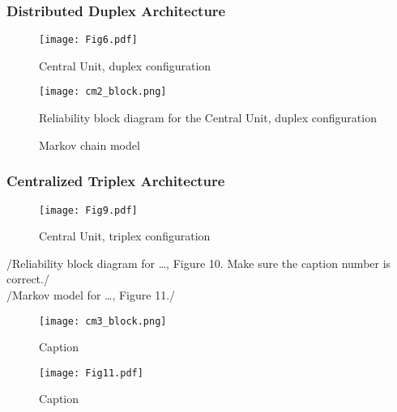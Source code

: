 \subsubsection{Distributed Duplex Architecture}
\begin{figure}[H]
  \centering
  \texttt{[image: Fig6.pdf]}
  \caption{Central Unit, duplex configuration }
  \label{fig6}
\end{figure}
\begin{figure}[H]
  \centering
  \texttt{[image: cm2\_block.png]}
  \caption{Reliability block diagram for the Central Unit, duplex configuration}
  \label{fig7}
\end{figure}
\begin{figure}[h!]
\begin{center}
\caption{Markov chain model}
\end{center}
\end{figure}
\subsubsection{Centralized Triplex Architecture}

\begin{figure}[H]
  \centering
  \texttt{[image: Fig9.pdf]}
  \caption{Central Unit, triplex configuration }
  \label{fig9}
\end{figure}
/{Reliability block diagram for …, Figure 10.  Make sure the caption number is correct.}/
\\/{Markov model for …, Figure 11.}/

\begin{figure}[H]
  \centering
  \texttt{[image: cm3\_block.png]}
  \caption{Caption }
  \label{fig10}
\end{figure}
\begin{figure}[H]
  \centering
  \texttt{[image: Fig11.pdf]}
  \caption{Caption}
  \label{fig11}
\end{figure}
